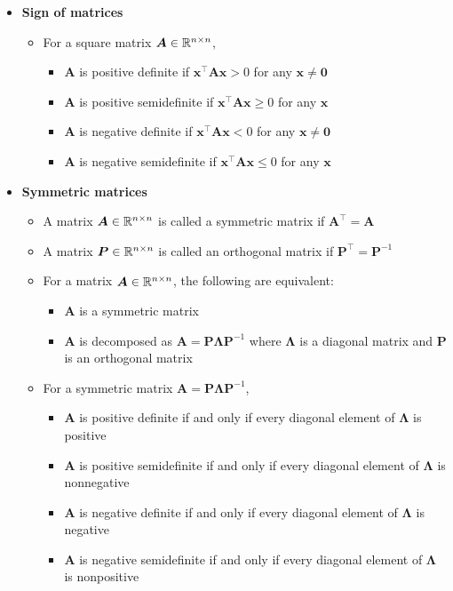 \documentclass[12pt,a4paper]{article}
\begin{document}
\begin{itemize}
\item \textbf{Sign of matrices}
  \begin{itemize}
  \item For a square matrix $\bm{A}\in \mathbb{R}^{n\times n}$,
    \begin{itemize}
    \item $\bm{A}$ is positive definite if $\bm{x}^{\top}\bm{A}\bm{x}>0$ for any $\bm{x}\neq \bm{0}$
    \item $\bm{A}$ is positive semidefinite if $\bm{x}^{\top}\bm{A}\bm{x}\geq 0$ for any $\bm{x}$
    \item $\bm{A}$ is negative definite if $\bm{x}^{\top}\bm{A}\bm{x}<0$ for any $\bm{x}\neq \bm{0}$
    \item $\bm{A}$ is negative semidefinite if $\bm{x}^{\top}\bm{A}\bm{x}\leq 0$ for any $\bm{x}$
    \end{itemize}
  \end{itemize}

\item \textbf{Symmetric matrices}
  \begin{itemize}
  \item A matrix $\bm{A}\in \mathbb{R}^{n\times n}$ is called a symmetric matrix if $\bm{A}^{\top} = \bm{A}$
  \item A matrix $\bm{P}\in \mathbb{R}^{n\times n}$ is called an orthogonal matrix if $\bm{P}^{\top} = \bm{P}^{-1}$
  \item For a  matrix $\bm{A}\in \mathbb{R}^{n\times n}$, the following are equivalent:
    \begin{itemize}
    \item $\bm{A}$ is a symmetric matrix
    \item $\bm{A}$ is decomposed as $\bm{A}=\bm{P}\bm{\Lambda}\bm{P}^{-1}$
      where $\bm{\Lambda}$ is a diagonal matrix and $\bm{P}$ is an orthogonal matrix
    \end{itemize}
  \item For a symmetric matrix $\bm{A}=\bm{P}\bm{\Lambda}\bm{P}^{-1}$,
    \begin{itemize}
    \item $\bm{A}$ is positive definite if and only if every diagonal element of $\bm{\Lambda}$ is positive
    \item $\bm{A}$ is positive semidefinite if and only if every diagonal element of $\bm{\Lambda}$ is nonnegative
    \item $\bm{A}$ is negative definite if and only if every diagonal element of $\bm{\Lambda}$ is negative
    \item $\bm{A}$ is negative semidefinite if and only if every diagonal element of $\bm{\Lambda}$ is nonpositive
    \end{itemize}
  \end{itemize}

\end{itemize}
\end{document}
